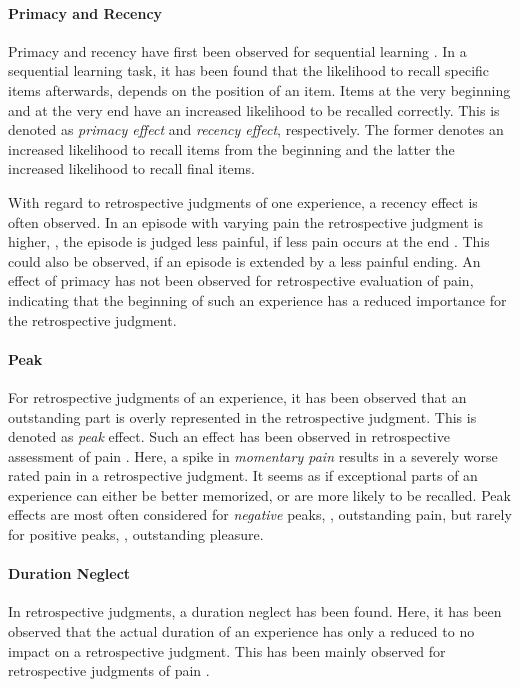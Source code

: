 \paragraph*{Primacy and Recency}
Primacy and recency have first been observed for sequential learning \citep[][]{murdock_jr._serial_1962}.
In a sequential learning task, it has been found that the likelihood to recall specific items afterwards, depends on the position of an item.
Items at the very beginning and at the very end have an increased likelihood to be recalled correctly.
This is denoted as \emph{primacy effect} and \emph{recency effect}, respectively.
The former denotes an increased likelihood to recall items from the beginning and the latter the increased likelihood to recall final items.

With regard to retrospective judgments of one experience, a recency effect is often observed.
In an episode with varying pain the retrospective judgment is higher, \ie, the episode is judged less painful, if less pain occurs at the end \citep[][]{kahneman_when_1993, redelmeier_patients_1996}.
This could also be observed, if an episode is extended by a less painful ending.
An effect of primacy has not been observed for retrospective evaluation of pain, indicating that the beginning of such an experience has a reduced importance for the retrospective judgment.

\paragraph*{Peak}
For retrospective judgments of an experience, it has been observed that an outstanding part is overly represented in the retrospective judgment.
This is denoted as \emph{peak} effect.
Such an effect has been observed in retrospective assessment of pain \citep[][]{kahneman_when_1993, redelmeier_patients_1996}.
Here, a spike in \emph{momentary pain} results in a severely worse rated pain in a retrospective judgment.
It seems as if exceptional parts of an experience can either be better memorized, or are more likely to be recalled.
Peak effects are most often considered for \emph{negative} peaks, \eg, outstanding pain, but rarely for positive peaks, \eg, outstanding pleasure.

\paragraph*{Duration Neglect}
In retrospective judgments, a duration neglect has been found.
Here, it has been observed that the actual duration of an experience has only a reduced to no impact on a retrospective judgment.
This has been mainly observed for retrospective judgments of pain \citep[][]{fredrickson_duration_1993, ariely_combining_1998}.

